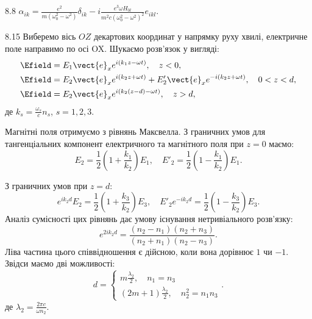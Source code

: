 \protect \section *{}
\begin{Solution}{8.{8}}
	$\alpha_{ik} = \frac{e^2}{m(\omega_0^2 - \omega^2)}\delta_{ik} - i \frac{e^3\omega
			H_{0l}}{m^2c(\omega_0^2 - \omega^2)^2}e_{ikl}$.
\end{Solution}
\begin{Solution}{8.{15}}
	Виберемо вісь $OZ$ декартових координат у напрямку руху хвилі, електричне поле направимо по осі
	OX. Шукаємо розв’язок у вигляді:
	\begin{align*}
		\Efield & = E_1\vect{e}_x e^{i(k_1z - \omega t)}, \quad z<0,                               \\
		\Efield & = E_2\vect{e}_x e^{i(k_2z + \omega t)} + E'_2\vect{e}_x e^{-i(k_2z + \omega t)},
		\quad 0<z<d,                                                                               \\
		\Efield & = E_2\vect{e}_x e^{i(k_2(z-d) - \omega t)}, \quad z>d,
	\end{align*}
	де $k_s = \frac{\omega_s}{c}n_s$, $s = 1,2,3$.

	Магнітні поля отримуємо з рівнянь Максвелла. З граничних умов для тангенціальних компонент
	електричного та магнітного поля при $z = 0$ маємо:
	\[
		E_2 = \frac{1}{2}\left(1 + \frac{k_1}{k_2} \right){E_1}, \quad E'_2 = \frac{1}{2}\left( 1 -
		\frac{k_1}{k_2} \right){E_1}.
	\]

	З граничних умов при  $z = d$:
	\[
		e^{ik_2d}{E_2} = \frac{1}{2}\left( 1 + \frac{k_3}{k_2} \right)E_3, \quad E'_2e^{- ik_2d} =
		\frac{1}{2}\left( 1 - \frac{k_3}{k_2} \right)E_3.
	\]
	Аналіз сумісності цих рівнянь дає умову існування нетривіального розв’язку:
	\[
		e^{2ik_2d} = \frac{(n_2 - n_1)(n_2 + n_3)}{(n_2 + n_1)(n_2 - n_3)}.
	\]
	Ліва частина цього співвідношення є дійсною, коли вона дорівнює $1$ чи $-1$. Звідси маємо дві
	можливості:
	\begin{equation*}
		d=
		\begin{cases}
			m\frac{\lambda_2}{2}, \quad n_1 = n_3 \\
			(2m+1)\frac{\lambda_2}{2}, \quad n_2^2 = n_1n_3
		\end{cases}.
	\end{equation*}
	де $\lambda_2 = \frac{2\pi c}{\omega n_2}$.
\end{Solution}
